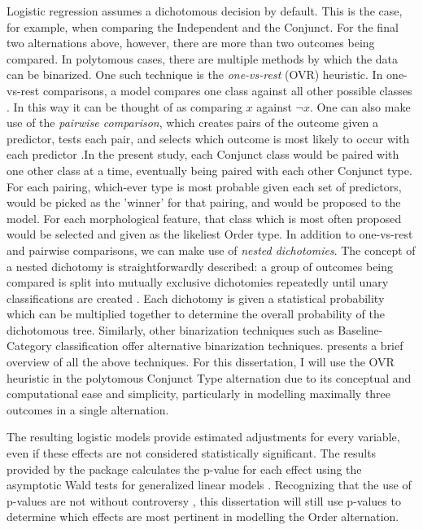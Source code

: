 Logistic regression assumes a dichotomous decision by default. This is the case, for example, when comparing the Independent and the Conjunct. For the final two alternations above, however, there are more than two outcomes being compared. In polytomous cases, there are multiple methods by which the data can be binarized. One such technique is the \textit{one-vs-rest} (OVR) heuristic. In one-vs-rest comparisons, a model compares one class against all other possible classes \citep{Kramer2004}. In this way it can be thought of as comparing $x$ against $\neg x$. One can also make use of the \textit{pairwise comparison}, which creates pairs of the outcome given a predictor, tests each pair, and selects which outcome is most likely to occur with each predictor \citep{Kramer2004}.In the present study, each Conjunct class would be paired with one other class at a time, eventually being paired with each other Conjunct type. For each pairing, which-ever type is most probable given each set of predictors, would be picked as the 'winner' for that pairing, and would be proposed to the model. For each morphological feature, that class which is most often proposed would be selected and given as the likeliest Order type. In addition to one-vs-rest and pairwise comparisons, we can make use of \textit{nested dichotomies}. The concept of a nested dichotomy is straightforwardly described: a group of outcomes being compared is split into mutually exclusive dichotomies repeatedly until unary classifications are created \citep{Kramer2004}. Each dichotomy is given a statistical probability which can be multiplied together to determine the overall probability of the dichotomous tree. Similarly, other binarization techniques such as Baseline-Category \citep[468]{fox1997applied} classification offer alternative binarization techniques. \citet{arppe2008univariate} presents a brief overview of all the above techniques. For this dissertation, I will use the OVR heuristic in the polytomous Conjunct Type alternation due to its conceptual and computational ease and simplicity, particularly in modelling maximally three outcomes in a single alternation.


The resulting logistic models provide estimated adjustments for every variable, even if these effects are not considered statistically significant. The results provided by the  package calculates the p-value for each effect using the asymptotic Wald tests for generalized linear models \citep{lme4}. Recognizing that the use of p-values are not without controversy \citep{gelman2016problems}, this dissertation will still use p-values to determine which effects are most pertinent in modelling the Order alternation.

